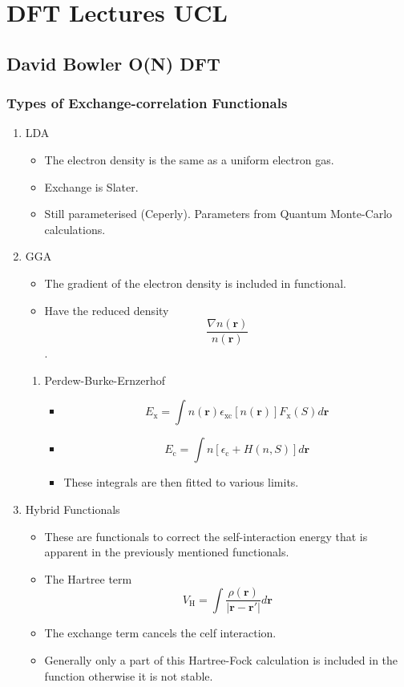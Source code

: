 \documentclass[11pt]{article}
\begin{document}
\section{DFT Lectures UCL}
\label{sec:org8ff4075}
\subsection{David Bowler O(N) DFT}
\label{sec:orgb46bd1d}
\subsubsection{Types of Exchange-correlation Functionals}
\label{sec:org3fe12bc}

\begin{enumerate}
\item LDA
\label{sec:org31a3726}
\begin{itemize}
\item The electron density is the same as a uniform electron gas.
\item Exchange is Slater.
\item Still parameterised (Ceperly). Parameters from Quantum Monte-Carlo
calculations.
\end{itemize}

\item GGA
\label{sec:orga6805d1}
\begin{itemize}
\item The gradient of the electron density is included in functional.
\item Have the reduced density \[ \frac{ \nabla n(\mathbf{r})}{n( \mathbf{r}
       )}\].
\end{itemize}
\begin{enumerate}
\item Perdew-Burke-Ernzerhof
\label{sec:orga47b8d6}
\begin{itemize}
\item \[ E_{\text{x}} = \int n( \mathbf{r} ) \epsilon_{\text{xc}}[n( \mathbf{r}
        )] F_{\text{x}}(S)d\mathbf{r} \]
\item \[ E_{\text{c}} = \int n[ \epsilon_{\text{c}} + H(n,S) ]d\mathbf{r} \]
\item These integrals are then fitted to various limits.
\end{itemize}
\end{enumerate}

\item Hybrid Functionals
\label{sec:org76a0f0e}
\begin{itemize}
\item These are functionals to correct the self-interaction energy that is
apparent in the previously mentioned functionals.
\item The Hartree term \[V_{\text{H}}=\int \frac{\rho(\mathbf{r})}{|\mathbf{r} - \mathbf{r}'|} d\mathbf{r}  \]
\item The exchange term cancels the celf interaction.
\item Generally only a part of this Hartree-Fock calculation is included in
the function otherwise it is not stable.
\end{itemize}






\end{enumerate}
\end{document}
